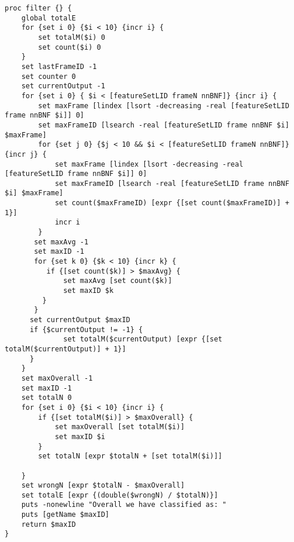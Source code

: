 \begin{lstlisting}[label=lst:CountingFilter,caption=Counting Filter employed to smooth/improve output]
proc filter {} {
    global totalE
    for {set i 0} {$i < 10} {incr i} {
        set totalM($i) 0
        set count($i) 0
    }
    set lastFrameID -1
    set counter 0
    set currentOutput -1
    for {set i 0} { $i < [featureSetLID frameN nnBNF]} {incr i} {
        set maxFrame [lindex [lsort -decreasing -real [featureSetLID frame nnBNF $i]] 0]
        set maxFrameID [lsearch -real [featureSetLID frame nnBNF $i] $maxFrame]
        for {set j 0} {$j < 10 && $i < [featureSetLID frameN nnBNF]} {incr j} {
            set maxFrame [lindex [lsort -decreasing -real [featureSetLID frame nnBNF $i]] 0]
            set maxFrameID [lsearch -real [featureSetLID frame nnBNF $i] $maxFrame]
            set count($maxFrameID) [expr {[set count($maxFrameID)] + 1}]
            incr i
        }
       set maxAvg -1
       set maxID -1
       for {set k 0} {$k < 10} {incr k} {
          if {[set count($k)] > $maxAvg} {
              set maxAvg [set count($k)]
              set maxID $k
         }
       }
      set currentOutput $maxID
      if {$currentOutput != -1} {
              set totalM($currentOutput) [expr {[set totalM($currentOutput)] + 1}]
      }
    }
    set maxOverall -1
    set maxID -1
    set totalN 0
    for {set i 0} {$i < 10} {incr i} {
        if {[set totalM($i)] > $maxOverall} {
            set maxOverall [set totalM($i)]
            set maxID $i
        }
        set totalN [expr $totalN + [set totalM($i)]]

    }
    set wrongN [expr $totalN - $maxOverall]
    set totalE [expr {(double($wrongN) / $totalN)}]
    puts -nonewline "Overall we have classified as: "
    puts [getName $maxID]
    return $maxID
}
\end{lstlisting}

